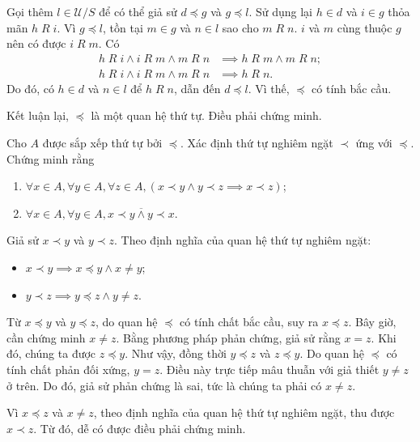 Gọi thêm $l \in \mathscr{U}/S$ để có thể giả sử $d \preccurlyeq g$ và $g \preccurlyeq l$. Sử dụng lại $h \in d$ và $i \in g$ thỏa mãn $h\;R\;i$. Vì $g \preccurlyeq l$, tồn tại $m \in g$ và $n \in l$ sao cho $m\;R\;n$. $i$ và $m$ cùng thuộc $g$ nên có được $i\;R\;m$. Có 
\begin{align*}
   h\;R\;i \land i\;R\;m \land m\;R\;n &\implies h\;R\;m \land m\;R\;n; \\
   h\;R\;i \land i\;R\;m \land m\;R\;n &\implies h\;R\;n.
\end{align*}
Do đó, có $h \in d$ và $n \in l$ để $h\;R\;n$, dẫn đến $d \preccurlyeq l$. Vì thế, $\preccurlyeq$ có tính bắc cầu.

Kết luận lại, $\preccurlyeq$ là một quan hệ thứ tự. Điều phải chứng minh.


\exercise Cho $A$ được sắp xếp thứ tự bởi $\preccurlyeq$. Xác định thứ tự nghiêm ngặt $\prec$ ứng với $\preccurlyeq$. Chứng minh rằng 
\begin{enumerate}
   \item $\forall x \in A, \forall y \in A, \forall z \in A, (x \prec y \land y \prec z\implies x \prec z) $;
   \item $\forall x \in A, \forall y \in A, \overline{x \prec y \land y \prec x}$.
\end{enumerate}

\solution

\resetSubexercise Giả sử $x \prec y$ và $y \prec z$. Theo định nghĩa của quan hệ thứ tự nghiêm ngặt:
\begin{itemize}
   \item $x \prec y \implies x \preccurlyeq y \land x \neq y$;
   \item $y \prec z \implies y \preccurlyeq z \land y \neq z$.
\end{itemize}

Từ $x \preccurlyeq y$ và $y \preccurlyeq z$, do quan hệ $\preccurlyeq$ có tính chất bắc cầu, suy ra $x \preccurlyeq z$. Bây giờ, cần chứng minh $x \neq z$. Bằng phương pháp phản chứng, giả sử rằng $x = z$. Khi đó, chúng ta được $z \preccurlyeq y$. Như vậy, đồng thời $y \preccurlyeq z$ và $z \preccurlyeq y$. Do quan hệ $\preccurlyeq$ có tính chất phản đối xứng, $y = z$.
Điều này trực tiếp mâu thuẫn với giả thiết $y \neq z$ ở trên. Do đó, giả sử phản chứng là sai, tức là chúng ta phải có $x \neq z$.

Vì $x \preccurlyeq z$ và $x \neq z$, theo định nghĩa của quan hệ thứ tự nghiêm ngặt, thu được $x \prec z$. Từ đó, dễ có được điều phải chứng minh.

